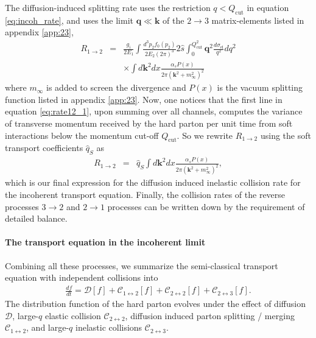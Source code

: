 \documentclass[aps, prc, reprint, amsmath, groupedaddress, nofootinbib]{revtex4-1}
\begin{document}
The diffusion-induced splitting rate uses the restriction $q<Q_{\textrm{cut}}$ in equation \ref{eq:incoh_rate}, and uses the limit $\mathbf{q} \ll \mathbf{k}$ of the $2\rightarrow 3$  matrix-elements listed in appendix \ref{app:23},
\begin{eqnarray}\nonumber
R_{1\rightarrow 2} &=& \frac{g_i}{2E_1}\int  \frac{d^3p_2f_0(p_2)}{2E_2(2\pi)^3} 2\hat{s} \int_{0}^{Q_{\textrm{cut}}^2} \mathbf{q}^2 \frac{d\sigma_{\textrm{el}}}{q^2} dq^2 
\\
&& \times \int d \mathbf{k}^2 dx \frac{\alpha_s P(x) }{2\pi (\mathbf{k}^2 + m_\infty^2)^2} \label{eq:rate12_1}
\end{eqnarray}
where $m_\infty$ is added to screen the divergence and $P(x)$ is the vacuum splitting function listed in appendix \ref{app:23}.
Now, one notices that the first line in equation \ref{eq:rate12_1}, upon summing over all channels, computes the variance of transverse momentum received by the hard parton per unit time from soft interactions below the momentum cut-off $Q_{\textrm{cut}}$.
So we rewrite $R_{1\rightarrow 2}$ using the soft transport coefficients $\hat{q}_{S}$ as
\begin{eqnarray}
R_{1\rightarrow 2} &=& \hat{q}_S\int d \mathbf{k}^2 dx \frac{\alpha_s P(x) }{2\pi (\mathbf{k}^2 + m_\infty^2)^2} \label{eq:rate12_2},
\end{eqnarray}
which is our final expression for the diffusion induced inelastic collision rate for the incoherent transport equation.
Finally, the collision rates of the reverse processes $3\rightarrow 2$ and $2\rightarrow 1$ processes can be written down by the requirement of detailed balance.

\paragraph{The transport equation in the incoherent limit}
Combining all these processes, we summarize the semi-classical transport equation with independent collisions into
\begin{eqnarray}\label{eq:incoh_transport}
\frac{df}{dt} = \mathcal{D}[f] + \mathcal{C}_{1\leftrightarrow 2}[f] + \mathcal{C}_{2\leftrightarrow 2}[f] + \mathcal{C}_{2\leftrightarrow 3}[f].
\end{eqnarray}
The distribution function of the hard parton evolves under the effect of diffusion $\mathcal{D}$, large-$q$ elastic collision $\mathcal{C}_{2\leftrightarrow 2}$,  diffusion induced parton splitting / merging $\mathcal{C}_{1\leftrightarrow 2}$, and large-$q$ inelastic collisions $\mathcal{C}_{2\leftrightarrow 3}$. 
\end{document}

